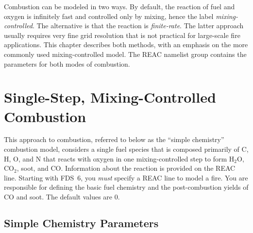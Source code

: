 \documentclass[11pt]{book}
\begin{document}
Combustion can be modeled in two ways. By default, the reaction of fuel and oxygen is infinitely fast and controlled only by mixing, hence
the label {\em mixing-controlled}. The alternative is that the reaction is {\em finite-rate}. The latter approach usually requires very fine grid resolution that is not
practical for large-scale fire applications. This chapter describes both methods, with an emphasis on the more
commonly used mixing-controlled model. The {\ct REAC} namelist group contains the parameters for both modes of combustion.


\section{Single-Step, Mixing-Controlled Combustion}

This approach to combustion, referred to below as the ``simple chemistry'' combustion model, considers a single fuel species that is composed primarily of C, H, O, and N that reacts with oxygen in one mixing-controlled step to form H$_2$O, CO$_2$, soot, and CO. Information about the reaction is provided on the {\ct REAC} line. Starting with FDS~6, you {\em must} specify a {\ct REAC} line to model a fire. You are responsible for defining the basic fuel chemistry and the post-combustion yields of CO and soot. The default values are 0.

\subsection{Simple Chemistry Parameters}
\label{info:simple_chemistry}
\end{document}
